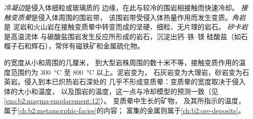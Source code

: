 \begin{definition}[接触变质晕及其岩石]\label{def:b2:magma-emplacement:aureole}
\emph{冷凝边}是侵入体细粒或玻璃质的
边缘，在此与较冷的围岩相接触而快速冷却。
\emph{接触变质晕}是侵入体周围的围岩带，
该围岩带受侵入体热量作用而发生变质。\emph{角岩}是
泥岩和火山岩在接触变质晕中转变而成的坚硬、细粒、无片理的岩石。
\emph{矽卡岩}是高温流体
与碳酸盐围岩发生反应所形成的岩石，沉淀出钙–铁–镁
硅酸盐（如石榴子石和辉石），常伴有磁铁矿和金属硫化物。
\end{definition}

的宽度从小和周围的几厘米，
到大型岩株周围的数十米不等，接触变质作用的温度范围约为
\qty{300}{\celsius} 至 \qty{800}{\celsius} 以上。泥岩变为，
石灰岩变为大理岩，砂岩变为石英岩。侵入到本已炽热岩石深处的
几乎不形成变质晕：变质晕的宽度取决于侵入体的大小和温度，
以及围岩的温度，这一点与冷却模型的预测一致（见\cref{exo:b2:magma-emplacement:12}）。
变质晕中生长的矿物，
及其所指示的温度，属于\cref{ch:b2:metamorphic-facies}的内容；
富集的金属则属于\cref{ch:b2:ore-deposits}。

